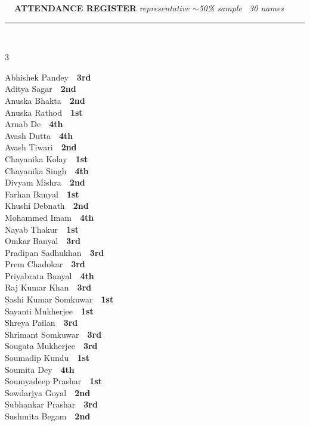\documentclass[11pt,a4paper]{article}
\begin{document}
\vspace{3pt}\noindent
{\footnotesize\bfseries\color{Slate}\faListOl~~ATTENDANCE REGISTER}%
\hfill{\scriptsize\itshape\color{Slate}representative $\sim$50\% sample \textperiodcentered\ 30 names}\\[3pt]
{\color{Line}\rule{\linewidth}{0.5pt}}\\[5pt]
\begingroup\footnotesize\setlength{\columnsep}{20pt}\setlength{\parskip}{1pt}%
\begin{multicols}{3}\raggedright
Abhishek Pandey~\dotfill~\textbf{3rd}\\
Aditya Sagar~\dotfill~\textbf{2nd}\\
Anuska Bhakta~\dotfill~\textbf{2nd}\\
Anuska Rathod~\dotfill~\textbf{1st}\\
Arnab De~\dotfill~\textbf{4th}\\
Avash Dutta~\dotfill~\textbf{4th}\\
Avash Tiwari~\dotfill~\textbf{2nd}\\
Chayanika Kolay~\dotfill~\textbf{1st}\\
Chayanika Singh~\dotfill~\textbf{4th}\\
Divyam Mishra~\dotfill~\textbf{2nd}\\
Farhan Banyal~\dotfill~\textbf{1st}\\
Khushi Debnath~\dotfill~\textbf{2nd}\\
Mohammed Imam~\dotfill~\textbf{4th}\\
Nayab Thakur~\dotfill~\textbf{1st}\\
Omkar Banyal~\dotfill~\textbf{3rd}\\
Pradipan Sadhukhan~\dotfill~\textbf{3rd}\\
Prem Chadokar~\dotfill~\textbf{3rd}\\
Priyabrata Banyal~\dotfill~\textbf{4th}\\
Raj Kumar Khan~\dotfill~\textbf{3rd}\\
Sashi Kumar Somkuwar~\dotfill~\textbf{1st}\\
Sayanti Mukherjee~\dotfill~\textbf{1st}\\
Shreya Pailan~\dotfill~\textbf{3rd}\\
Shrimant Somkuwar~\dotfill~\textbf{3rd}\\
Sougata Mukherjee~\dotfill~\textbf{3rd}\\
Soumadip Kundu~\dotfill~\textbf{1st}\\
Soumita Dey~\dotfill~\textbf{4th}\\
Soumyadeep Prashar~\dotfill~\textbf{1st}\\
Sowdarjya Goyal~\dotfill~\textbf{2nd}\\
Subhankar Prashar~\dotfill~\textbf{3rd}\\
Sushmita Begam~\dotfill~\textbf{2nd}\\
\end{multicols}
\endgroup
\end{document}
